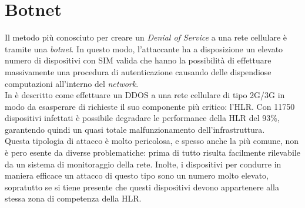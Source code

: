 \section{Botnet}
Il metodo più conosciuto per creare un \textit{Denial of Service} a una rete cellulare è tramite una \textit{botnet}.
In questo modo, l'attaccante ha a disposizione un elevato numero di dispositivi con SIM valida che hanno la possibilità di effettuare massivamente una procedura
di autenticazione causando delle dispendiose computazioni all'interno del \textit{network}.\\
In \cite{measuring-dos} è descritto come effettuare un DDOS a una rete cellulare di tipo 2G/3G in modo da esasperare di richieste il suo componente più critico: l'HLR.
Con 11750 dispositivi infettati è possibile degradare le performance della HLR del 93\%\cite{measuring-dos}, garantendo quindi un quasi totale malfunzionamento dell'infrastruttura.\\
Questa tipologia di attacco è molto pericolosa, e spesso anche la più comune, non è pero esente da diverse problematiche: prima di tutto risulta facilmente rilevabile da un sistema di 
monitoraggio della rete. Inolte, i dispositivi per condurre in maniera efficace un attacco di questo tipo sono un numero molto elevato, sopratutto se si tiene presente che questi dispositivi devono 
appartenere alla stessa zona di competenza della HLR.\\

\clearpage

